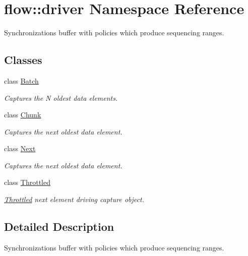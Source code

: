 \hypertarget{namespaceflow_1_1driver}{}\section{flow\+:\+:driver Namespace Reference}
\label{namespaceflow_1_1driver}


Synchronizations buffer with policies which produce sequencing ranges.  


\subsection*{Classes}
\begin{DoxyCompactItemize}
\item 
class \hyperlink{classflow_1_1driver_1_1_batch}{Batch}
\begin{DoxyCompactList}\small\item\em Captures the N oldest data elements. \end{DoxyCompactList}\item 
class \hyperlink{classflow_1_1driver_1_1_chunk}{Chunk}
\begin{DoxyCompactList}\small\item\em Captures the next oldest data element. \end{DoxyCompactList}\item 
class \hyperlink{classflow_1_1driver_1_1_next}{Next}
\begin{DoxyCompactList}\small\item\em Captures the next oldest data element. \end{DoxyCompactList}\item 
class \hyperlink{classflow_1_1driver_1_1_throttled}{Throttled}
\begin{DoxyCompactList}\small\item\em \hyperlink{classflow_1_1driver_1_1_throttled}{Throttled} next element driving capture object. \end{DoxyCompactList}\end{DoxyCompactItemize}


\subsection{Detailed Description}
Synchronizations buffer with policies which produce sequencing ranges. 